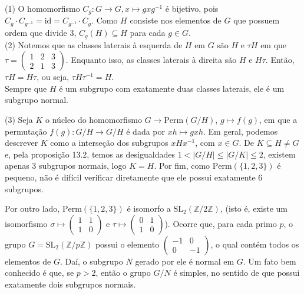 \begin{exemplo}
\begin{enumerate}[left=0.5cm, align=left, nosep]
        (1) O homomorfismo $C_g : G \to G, x \mapsto gxg^{-1}$ é bijetivo, pois $C_g \cdot C_{g^{-1}} = \mathrm{id} = C_{g^{-1}} 
        \cdot C_g$. Como $H$ consiste nos elementos de $G$ que possuem ordem que divide $3$, $C_g(H) \subseteq H$ para cada 
        $g \in G$. \\
        (2) Notemos que as classes laterais à esquerda de $H$ em $G$ são $H$ e $\tau H$ em que 
        $\tau =
        \begin{pmatrix}
        1 & 2 & 3 \\
        2 & 1 & 3
        \end{pmatrix}$. Enquanto isso, as classes laterais à direita são $H$ e $H\tau$.
        Então, $\tau H = H \tau$, ou seja, $\tau H \tau^{-1} = H$. \\
        Sempre que $H$ é um subgrupo com exatamente duas classes laterais, ele é um subgrupo normal.

        (3) Seja $K$ o núcleo do homomorfismo $G \to \mathrm{Perm}(G/H)$, $g \mapsto f(g)$, em que a permutação $f(g): G/H \to G/H$ 
        é dada por $xh \mapsto gxh$. Em geral, podemos descrever $K$ como a interseção dos subgrupos $xHx^{-1}$, com $x \in G$.
        De $K \subseteq H \neq G$ e, pela proposição 13.2, temos as desigualdades $1 < |G/H| \leq |G/K| \leq 2$, existem apenas 
        3 subgrupos normais, logo $K = H$.
        Por fim, como $\mathrm{Perm}(\{1,2,3\})$ é pequeno, não é difícil verificar diretamente que ele possui 
        exatamente $6$ subgrupos.

        Por outro lado, $\mathrm{Perm}(\{1,2,3\})$ é isomorfo a $\mathrm{SL}_2(\mathbb{Z}/2\mathbb{Z})$, (isto é, existe um
        isomorfismo $\sigma \mapsto \begin{pmatrix} 1 & 1 \\ 1 & 0 \end{pmatrix}$ e $\tau \mapsto \begin{pmatrix} 0 & 1 \\ 
        1 & 0 \end{pmatrix}$). Ocorre que, para cada primo $p$, o grupo $G = \mathrm{SL}_2(\mathbb{Z}/p\mathbb{Z})$
        possui o elemento $\begin{pmatrix} -1 & 0 \\ 0 & -1 \end{pmatrix}$, o qual contém todos os elementos de $G$. Daí, o 
        subgrupo $N$ gerado por ele é normal em $G$. Um fato bem conhecido é que, se $p > 2$, então o grupo $G/N$ é simples,
        no sentido de que possui exatamente dois subgrupos normais.


\end{enumerate}
\end{exemplo}
